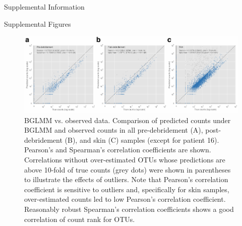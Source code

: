\documentclass[oneside,12pt,final]{sty/ucthesis-CA2012}
\begin{document}
\begin{mainmatter}
\begin{section}{Supplemental Information}
\begin{subsection}{Supplemental Figures}
\begin{figure}[h]
\centering
\centerline{\includegraphics[width=\textwidth]{fig/C3figS6ABC.pdf}}
\caption{BGLMM vs. observed data. Comparison of predicted counts under BGLMM and observed counts in all pre-debridement (A), post-debridement (B), and skin (C) samples (except for patient 16). Pearson’s and Spearman’s correlation coefficients are shown. Correlations without over-estimated OTUs whose predictions are above 10-fold of true counts (grey dots) were shown in parentheses to illustrate the effects of outliers. Note that Pearson’s correlation coefficient is sensitive to outliers and, specifically for skin samples, over-estimated counts led to low Pearson’s correlation coefficient. Reasonably robust Spearman’s correlation coefficients shows a good correlation of count rank for OTUs.}
\label{fig:S6}
\end{figure}


\end{subsection}
\end{section}
\end{mainmatter}
\end{document}
